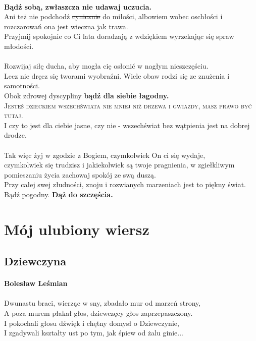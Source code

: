 \documentclass[12pt]{article}
\begin{document}
\paragraph{}
\textbf{Bądź sobą, zwłaszcza nie udawaj uczucia.}\\
Ani też nie podchodź \sout{cynicznie} do miłości, albowiem wobec oschłości i rozczarowań ona jest wieczna jak trawa.\\
Przyjmij spokojnie co Ci lata doradzają z wdziękiem wyrzekając się spraw młodości.
\paragraph{}
Rozwijaj siłę ducha, aby mogła cię osłonić w nagłym nieszczęściu.\\
Lecz nie dręcz się tworami wyobraźni. Wiele obaw rodzi się ze znużenia i samotności.\\
Obok zdrowej dyscypliny \textbf{bądź dla siebie łagodny.}\\
\textsc{Jesteś dzieckiem wszechświata nie mniej niż drzewa i gwiazdy, masz prawo być tutaj.}\\
I czy to jest dla ciebie jasne, czy nie - wszechświat bez wątpienia jest na dobrej drodze.
\paragraph{}
Tak więc żyj w zgodzie z Bogiem, czymkolwiek On ci się wydaje,\\
czymkolwiek się trudzisz i jakiekolwiek są twoje pragnienia, w zgiełkliwym pomieszaniu życia zachowaj spokój ze swą duszą.\\
Przy całej swej złudności, znoju i rozwianych marzeniach jest to piękny świat.\\
Bądź pogodny. \textbf{Dąż do szczęścia.}\cite{Dezyderata}

\section{Mój ulubiony wiersz}
\subsection{Dziewczyna}
\paragraph{Bolesław Leśmian}

\paragraph{}
Dwunastu braci, wierząc w sny, zbadało mur od marzeń strony,\\
A poza murem płakał głos, dziewczęcy głos zaprzepaszczony.\\
I pokochali głosu dźwięk i chętny domysł o Dziewczynie,\\
I zgadywali kształty ust po tym, jak śpiew od żalu ginie...\\
\end{document}
